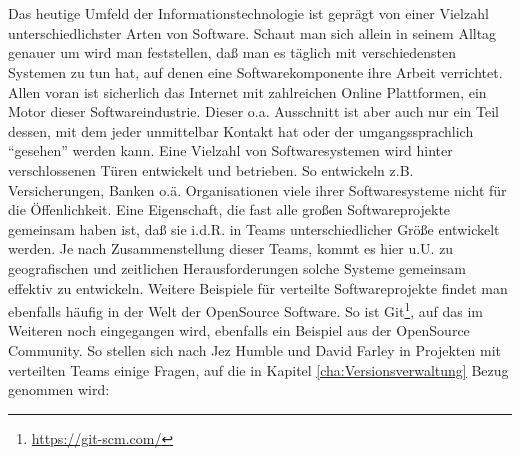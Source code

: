 \chapter{\preamble}
\label{cha:preamble}
Das heutige Umfeld der Informationstechnologie ist gepr\"agt von einer Vielzahl
unterschiedlichster Arten von Software. Schaut man sich allein in seinem Alltag
genauer um wird man feststellen, daß man es täglich mit verschiedensten
Systemen zu tun hat, auf denen eine Softwarekomponente ihre Arbeit verrichtet.
Allen voran ist sicherlich das Internet mit zahlreichen Online Plattformen, ein
Motor dieser Softwareindustrie. Dieser o.a. Ausschnitt ist aber auch nur ein
Teil dessen, mit dem jeder unmittelbar Kontakt hat oder der umgangssprachlich
"`gesehen"' werden kann. Eine Vielzahl von Softwaresystemen wird hinter
verschlossenen T\"uren entwickelt und betrieben. So entwickeln z.B.
Versicherungen, Banken o.\"a. Organisationen viele ihrer Softwaresysteme nicht
f\"ur die \"Offenlichkeit. Eine Eigenschaft, die fast alle gro\ss{}en
Softwareprojekte gemeinsam haben ist, daß sie i.d.R. in Teams unterschiedlicher
Gr\"o\ss{}e entwickelt werden. Je nach Zusammenstellung dieser Teams, kommt es
hier u.U. zu geografischen und zeitlichen Herausforderungen solche Systeme
gemeinsam effektiv zu entwickeln.  Weitere Beispiele f\"ur verteilte
Softwareprojekte findet man ebenfalls h\"aufig in der Welt der \gls{OpenSource}
Software. So ist Git\footnote{\label{git:1}\url{https://git-scm.com/}}, auf das
im Weiteren noch eingegangen wird, ebenfalls ein Beispiel aus der
\gls{OpenSource} Community. So stellen sich nach Jez Humble und David Farley in
Projekten mit verteilten Teams einige Fragen, auf die in Kapitel
\ref{cha:Versionsverwaltung} Bezug genommen wird\cite[S.~26, 33]{cd}:
